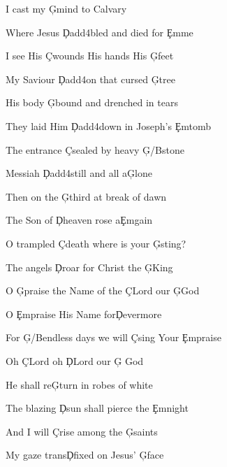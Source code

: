 \documentclass[9pt]{extarticle}
\begin{document}
\bsong

\bv
I cast my \c{G}mind to Calvary

Where Jesus \c{Dadd4}bled and died for \c{Em}me

I see His \c{C}wounds His hands His \c{G}feet

My Saviour \c{Dadd4}on that cursed \c{G}tree
\ev

\bv
His body \c{G}bound and drenched in tears

They laid Him \c{Dadd4}down in Joseph's \c{Em}tomb

The entrance \c{C}sealed by heavy \c{G/B}stone

Messiah \c{Dadd4}still and all a\c{G}lone
\ev

\bv
Then on the \c{G}third at break of dawn

The Son of \c{D}heaven rose a\c{Em}gain

O trampled \c{C}death where is your \c{G}sting?

The angels \c{D}roar for Christ the \c{G}King
\ev

\bc
O \c{G}praise the Name of the \c{C}Lord our \c{G}God

O \c{Em}praise His Name for\c{D}evermore

For \c{G/B}endless days we will \c{C}sing Your \c{Em}praise

Oh \c{C}Lord oh \c{D}Lord our \c{G} God
\ec

\bv
He shall re\c{G}turn in robes of white

The blazing \c{D}sun shall pierce the \c{Em}night

And I will \c{C}rise among the \c{G}saints

My gaze trans\c{D}fixed on Jesus' \c{G}face
\ev


\esong
\end{document}
